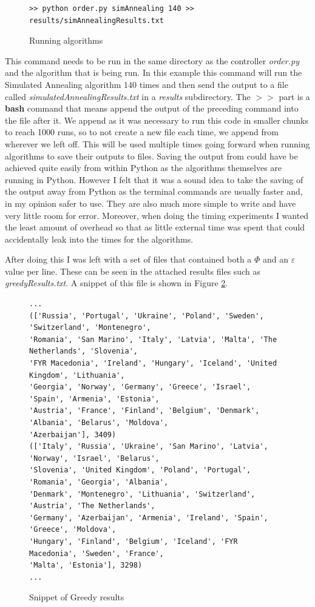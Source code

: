 \documentclass[12pt]{report}
\begin{document}
\begin{figure}[H]
\caption{Running algorithms}
\label{makeResults}
\begin{verbatim}
>> python order.py simAnnealing 140 >> results/simAnnealingResults.txt
\end{verbatim}
\end{figure}
This command needs to be run in the same directory as the controller \textit{order.py} and the algorithm that is being run. In this example this command will run the Simulated Annealing algorithm 140 times and then send the output to a file called \textit{simulatedAnnealingResults.txt} in a \textit{results} subdirectory. The $>>$ part is a \textbf{bash} command that means append the output of the preceding command into the file after it. We append as it was necessary to run this code in smaller chunks to reach 1000 runs, so to not create a new file each time, we append from wherever we left off. This will be used multiple times going forward when running algorithms to save their outputs to files. Saving the output from could have be achieved quite easily from within Python as the algorithms themselves are running in Python. However I felt that it was a sound idea to take the saving of the output away from Python as the terminal commands are usually faster and, in my opinion safer to use. They are also much more simple to write and have very little room for error. Moreover, when doing the timing experiments I wanted the least amount of overhead so that as little external time was spent that could accidentally leak into the times for the algorithms.


After doing this I was left with a set of files that contained both a $\Phi$ and an $\varepsilon$ value per line. These can be seen in the attached results files such as \textit{greedyResults.txt}. A snippet of this file is shown in Figure \ref{greedyResFile}.

\begin{figure}[H]
\caption{Snippet of Greedy results}
\label{greedyResFile}
\begin{verbatim}
...
(['Russia', 'Portugal', 'Ukraine', 'Poland', 'Sweden', 'Switzerland', 'Montenegro',
'Romania', 'San Marino', 'Italy', 'Latvia', 'Malta', 'The Netherlands', 'Slovenia', 
'FYR Macedonia', 'Ireland', 'Hungary', 'Iceland', 'United Kingdom', 'Lithuania', 
'Georgia', 'Norway', 'Germany', 'Greece', 'Israel', 'Spain', 'Armenia', 'Estonia', 
'Austria', 'France', 'Finland', 'Belgium', 'Denmark', 'Albania', 'Belarus', 'Moldova', 
'Azerbaijan'], 3409)
(['Italy', 'Russia', 'Ukraine', 'San Marino', 'Latvia', 'Norway', 'Israel', 'Belarus', 
'Slovenia', 'United Kingdom', 'Poland', 'Portugal', 'Romania', 'Georgia', 'Albania', 
'Denmark', 'Montenegro', 'Lithuania', 'Switzerland', 'Austria', 'The Netherlands', 
'Germany', 'Azerbaijan', 'Armenia', 'Ireland', 'Spain', 'Greece', 'Moldova', 
'Hungary', 'Finland', 'Belgium', 'Iceland', 'FYR Macedonia', 'Sweden', 'France', 
'Malta', 'Estonia'], 3298)
...
\end{verbatim}
\end{figure}
\end{document}
